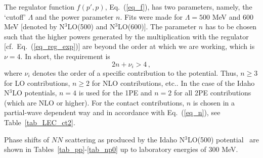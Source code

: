 \documentclass[sort&compress,preprint,3p]{elsarticle}
\begin{document}
The regulator function $f(p',p)$, Eq.~(\ref{eq_f}), has two parameters, namely, the
`cutoff' $\Lambda$ and the power parameter $n$.
Fits were made for $\Lambda=500$ MeV and 600 MeV 
[denoted by N$^3$LO(500) and N$^3$LO(600)].
The parameter $n$ has to be chosen such that the higher powers
generated by the multiplication with the regulator [cf.\ Eq.~(\ref{eq_reg_exp})] are beyond the order
at which we are working, which is $\nu=4$.
In short, the requirement is 
\begin{equation}
2n+\nu_i>4 \,,
\label{eq_n}
\end{equation}
where $\nu_i$ denotes the order of a specific contribution to the potential. 
Thus, $n\geq 3$ for LO contributions,
$n\geq 2$ for NLO contributions, etc..
In the case of the Idaho N$^3$LO potentials,
$n=4$ is used for the 1PE and
$n=2$ for all 2PE contributions (which are NLO or higher).
For the contact contributions, $n$ is chosen in a partial-wave dependent
way and in accordance with Eq.~(\ref{eq_n}), see Table~\ref{tab_LEC_ct2}.

Phase shifts of $NN$ scattering 
as produced by the Idaho N$^3$LO(500) potential~\cite{EM03}
are shown in Tables~\ref{tab_pp}-\ref{tab_np0}
up to laboratory energies of 300 MeV.
\end{document}
